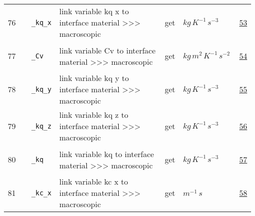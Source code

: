 \begin{longtable}{|p{1cm}|p{2.5cm}|p{4.5cm}|p{8cm}|p{3.0cm}|p{3cm}|p{1cm}|}
                 \\
        76
             & \hypertarget{"v:76"}{ $ {} $}
             & \verb|_kq_x|
             & link variable kq x to interface material >>> macroscopic
             & \begin{lay}get \end{lay}
             & $ kg \,K^{-1} \,s^{-3} \, $
             &                 \hyperlink{"e:53"}{ 53 }
                 \\
        77
             & \hypertarget{"v:77"}{ $ {} $}
             & \verb|_Cv|
             & link variable Cv to interface material >>> macroscopic
             & \begin{lay}get \end{lay}
             & $ kg \,m^{2} \,K^{-1} \,s^{-2} \, $
             &                 \hyperlink{"e:54"}{ 54 }
                 \\
        78
             & \hypertarget{"v:78"}{ $ {} $}
             & \verb|_kq_y|
             & link variable kq y to interface material >>> macroscopic
             & \begin{lay}get \end{lay}
             & $ kg \,K^{-1} \,s^{-3} \, $
             &                 \hyperlink{"e:55"}{ 55 }
                 \\
        79
             & \hypertarget{"v:79"}{ $ {} $}
             & \verb|_kq_z|
             & link variable kq z to interface material >>> macroscopic
             & \begin{lay}get \end{lay}
             & $ kg \,K^{-1} \,s^{-3} \, $
             &                 \hyperlink{"e:56"}{ 56 }
                 \\
        80
             & \hypertarget{"v:80"}{ $ {} $}
             & \verb|_kq|
             & link variable kq to interface material >>> macroscopic
             & \begin{lay}get \end{lay}
             & $ kg \,K^{-1} \,s^{-3} \, $
             &                 \hyperlink{"e:57"}{ 57 }
                 \\
        81
             & \hypertarget{"v:81"}{ $ {} $}
             & \verb|_kc_x|
             & link variable kc x to interface material >>> macroscopic
             & \begin{lay}get \end{lay}
             & $ m^{-1} \,s \, $
             &                 \hyperlink{"e:58"}{ 58 }

\end{longtable}
